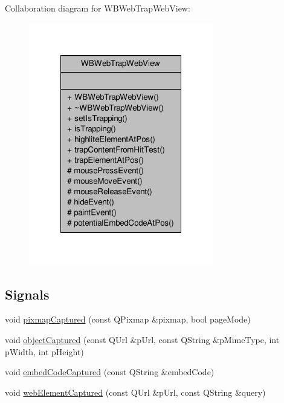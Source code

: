 Collaboration diagram for W\-B\-Web\-Trap\-Web\-View\-:
\nopagebreak
\begin{figure}[H]
\begin{center}
\leavevmode
\includegraphics[width=228pt]{db/d96/class_w_b_web_trap_web_view__coll__graph}
\end{center}
\end{figure}
\subsection*{Signals}
\begin{DoxyCompactItemize}
\item 
void \hyperlink{class_w_b_web_trap_web_view_aafcb1f705401191f337e7f2b4ad2b445}{pixmap\-Captured} (const Q\-Pixmap \&pixmap, bool page\-Mode)
\item 
void \hyperlink{class_w_b_web_trap_web_view_a1b57df58084eb4142cd8644427044fe0}{object\-Captured} (const Q\-Url \&p\-Url, const Q\-String \&p\-Mime\-Type, int p\-Width, int p\-Height)
\item 
void \hyperlink{class_w_b_web_trap_web_view_ab37566289a6639586c3b0878c6bf7bcc}{embed\-Code\-Captured} (const Q\-String \&embed\-Code)
\item 
void \hyperlink{class_w_b_web_trap_web_view_af54b425effeae63730c75cd5eb6f501f}{web\-Element\-Captured} (const Q\-Url \&p\-Url, const Q\-String \&query)
\end{DoxyCompactItemize}
